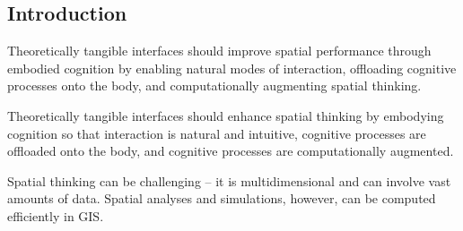 







\subsection{Introduction}
Theoretically tangible interfaces 
should improve spatial performance 
through embodied cognition by 
enabling natural modes of interaction, 
offloading cognitive processes onto the body, 
and computationally augmenting spatial thinking.

Theoretically tangible interfaces 
should enhance spatial thinking 
by embodying cognition so that 
interaction is natural and intuitive,
cognitive processes are offloaded onto the body,
and cognitive processes are computationally augmented.


Spatial thinking can be challenging --
it is multidimensional and 
can involve vast amounts of data. 
Spatial analyses and simulations, however, 
can be computed efficiently in GIS. 
%


